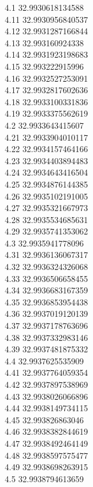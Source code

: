 {4.1	32.9930618134588\\
4.11	32.9930956840537\\
4.12	32.9931287166844\\
4.13	32.993160924338\\
4.14	32.9931923198683\\
4.15	32.993222915996\\
4.16	32.9932527253091\\
4.17	32.9932817602636\\
4.18	32.9933100331836\\
4.19	32.9933375562619\\
4.2	32.9933643415607\\
4.21	32.9933904010117\\
4.22	32.9934157464166\\
4.23	32.9934403894483\\
4.24	32.9934643416504\\
4.25	32.9934876144385\\
4.26	32.9935102191005\\
4.27	32.9935321667973\\
4.28	32.9935534685631\\
4.29	32.9935741353062\\
4.3	32.9935941778096\\
4.31	32.9936136067317\\
4.32	32.9936324326068\\
4.33	32.9936506658455\\
4.34	32.9936683167359\\
4.35	32.9936853954438\\
4.36	32.9937019120139\\
4.37	32.9937178763696\\
4.38	32.9937332983146\\
4.39	32.9937481875332\\
4.4	32.9937625535909\\
4.41	32.9937764059354\\
4.42	32.9937897538969\\
4.43	32.9938026066896\\
4.44	32.9938149734115\\
4.45	32.993826863046\\
4.46	32.9938382844619\\
4.47	32.9938492464149\\
4.48	32.9938597575477\\
4.49	32.9938698263915\\
4.5	32.9938794613659\\
}
